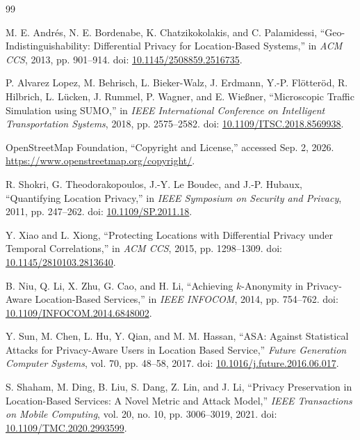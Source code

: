 \documentclass[12pt,a4paper,oneside]{report}
\begin{document}
\begingroup
\raggedright
\begin{thebibliography}{99}

M. E. Andrés, N. E. Bordenabe, K. Chatzikokolakis, and C. Palamidessi,
``Geo-Indistinguishability: Differential Privacy for Location-Based Systems,''
in \emph{ACM CCS}, 2013, pp. 901--914.
doi: \href{https://doi.org/10.1145/2508859.2516735}{10.1145/2508859.2516735}.

P. Alvarez Lopez, M. Behrisch, L. Bieker-Walz, J. Erdmann,
Y.-P. Flötteröd, R. Hilbrich, L. Lücken, J. Rummel,
P. Wagner, and E. Wießner,
``Microscopic Traffic Simulation using SUMO,''
in \emph{IEEE International Conference on Intelligent Transportation Systems},
2018, pp. 2575--2582.
doi: \href{https://doi.org/10.1109/ITSC.2018.8569938}{10.1109/ITSC.2018.8569938}.

OpenStreetMap Foundation,
``Copyright and License,'' accessed Sep. 2, 2026.
\url{https://www.openstreetmap.org/copyright/}.

R. Shokri, G. Theodorakopoulos, J.-Y. Le Boudec, and J.-P. Hubaux,
``Quantifying Location Privacy,'' in \emph{IEEE Symposium on Security and Privacy},
2011, pp. 247--262.
doi: \href{https://doi.org/10.1109/SP.2011.18}{10.1109/SP.2011.18}.

Y. Xiao and L. Xiong,
``Protecting Locations with Differential Privacy under Temporal Correlations,''
in \emph{ACM CCS}, 2015, pp. 1298--1309.
doi: \href{https://doi.org/10.1145/2810103.2813640}{10.1145/2810103.2813640}.

B. Niu, Q. Li, X. Zhu, G. Cao, and H. Li,
``Achieving $k$-Anonymity in Privacy-Aware Location-Based Services,''
in \emph{IEEE INFOCOM}, 2014, pp. 754--762.
doi: \href{https://doi.org/10.1109/INFOCOM.2014.6848002}{10.1109/INFOCOM.2014.6848002}.

Y. Sun, M. Chen, L. Hu, Y. Qian, and M. M. Hassan,
``ASA: Against Statistical Attacks for Privacy-Aware Users in Location Based Service,''
\emph{Future Generation Computer Systems}, vol. 70, pp. 48--58, 2017.
doi: \href{https://doi.org/10.1016/j.future.2016.06.017}{10.1016/j.future.2016.06.017}.

S. Shaham, M. Ding, B. Liu, S. Dang, Z. Lin, and J. Li,
``Privacy Preservation in Location-Based Services: A Novel Metric and Attack Model,''
\emph{IEEE Transactions on Mobile Computing}, vol. 20, no. 10,
pp. 3006--3019, 2021.
doi: \href{https://doi.org/10.1109/TMC.2020.2993599}{10.1109/TMC.2020.2993599}.


\end{thebibliography}
\end{document}
